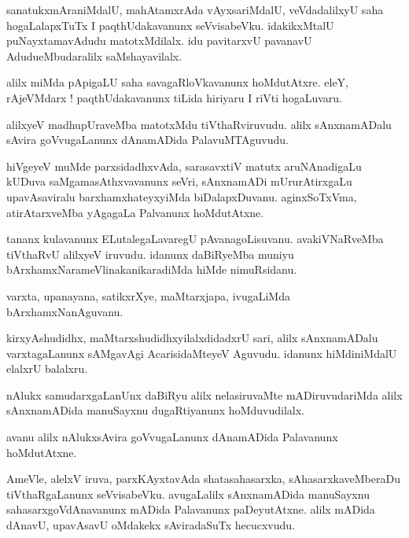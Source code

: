 \documentclass{article}
\begin{document}
\begin{mn}
sanatukxmAraniMdalU, mahAtamxrAda vAyxsariMdalU, veVdadalilxyU saha hogaLalapxTuTx I 
paqthUdakavanunx seVvisabeVku. idakikxMtalU puNayxtamavAdudu matotxMdilalx. idu pavitarxvU 
pavanavU AdudueMbudaralilx saMshayavilalx.
\end{mn}

\begin{mn}
alilx miMda pApigaLU saha savagaRloVkavanunx hoMdutAtxre. eleY, rAjeVMdarx ! paqthUdakavanunx 
tiLida hiriyaru I riVti hogaLuvaru. 
\end{mn}

\begin{mn}
alilxyeV madhupUraveMba matotxMdu tiVthaRviruvudu. alilx sAnxnamADalu sAvira goVvugaLanunx 
dAnamADida PalavuMTAguvudu.
\end{mn}

\begin{mn}
hiVgeyeV muMde parxsidadhxvAda, sarasavxtiV matutx aruNAnadigaLu kUDuva saMgamasAthxvavanunx seVri, 
sAnxnamADi mUrurAtirxgaLu upavAsaviralu barxhamxhateyxyiMda 
biDalapxDuvanu. aginxSoTxVma, atirAtarxveMba yAgagaLa Palvanunx hoMdutAtxne. 
\end{mn}

\begin{mn}
tananx kulavanunx ELutalegaLavaregU pAvanagoLisuvanu. avakiVNaRveMba tiVthaRvU alilxyeV iruvudu.
idanunx daBiRyeMba muniyu bArxhamxNarameVlinakanikaradiMda hiMde nimuRsidanu.
\end{mn}

\begin{mn}
varxta, upanayana, satikxrXye, maMtarxjapa, ivugaLiMda bArxhamxNanAguvanu.
\end{mn}

\begin{mn}
kirxyAshudidhx, maMtarxshudidhxyilalxdidadxrU sari, alilx sAnxnamADalu varxtagaLanunx sAMgavAgi 
AcarisidaMteyeV Aguvudu. idanunx  hiMdiniMdalU elalxrU balalxru.
\end{mn}

\begin{mn}
nAlukx samudarxgaLanUnx daBiRyu alilx nelasiruvaMte mADiruvudariMda alilx sAnxnamADida manuSayxnu 
dugaRtiyanunx hoMduvudilalx.
\end{mn}

\begin{mn}
avanu alilx nAlukxsAvira goVvugaLanunx dAnamADida Palavanunx hoMdutAtxne.
\end{mn}

\begin{mn}
AmeVle, alelxV iruva, parxKAyxtavAda shatasahasarxka, sAhasarxkaveMberaDu tiVthaRgaLanunx 
seVvisabeVku. avugaLalilx sAnxnamADida manuSayxnu sahasarxgoVdAnavanunx mADida Palavanunx 
paDeyutAtxne. alilx mADida dAnavU, upavAsavU oMdakekx sAviradaSuTx hecucxvudu.
\end{mn}
\end{document}

